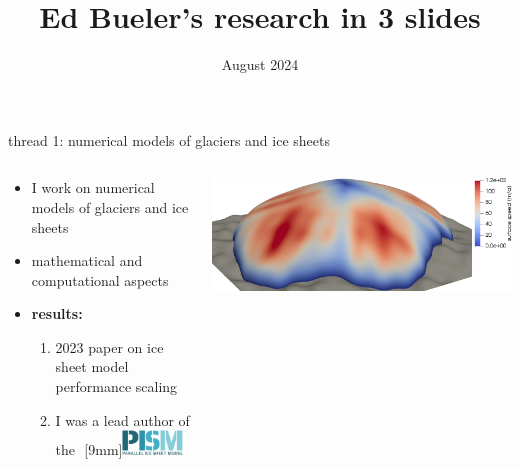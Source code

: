 \documentclass[svgnames,
               hyperref={colorlinks,citecolor=DeepPink4,linkcolor=FireBrick,urlcolor=Maroon},
               usepdftitle=false]  %
               {beamer}
\title{Ed Bueler's research in 3 slides}
\institute[]{Department of Mathematics \& Statistics \\ University of Alaska Fairbanks}
\date[]{\footnotesize August 2024}
\begin{document}
\addtocounter{framenumber}{-1}

\beamertemplatenavigationsymbolsempty

{
  \begin{frame}

\vspace{10mm}

    \titlepage
  \end{frame}
}


\begin{frame}{thread 1: numerical models of glaciers and ice sheets}

\begin{columns}
\begin{column}{0.45\textwidth}
\begin{itemize}
\item I work on {\color{FireBrick} numerical models of glaciers and ice sheets}
\item mathematical and computational aspects
\item \textbf{results:}
    \begin{enumerate}
    \item 2023 paper on ice sheet model performance scaling    
    \item I was a lead author of the \,\,\raisebox{-9pt}[9mm]{\href{https://www.pism.io/}{\includegraphics[width=0.45\textwidth]{figs/pism.png}}}
    \end{enumerate}

\end{itemize}
\end{column}
\begin{column}{0.55\textwidth}
\hfill \includegraphics[width=\textwidth]{figs/sialev8scene.png}


\end{column}
\end{columns}
\end{frame}
\end{document}

